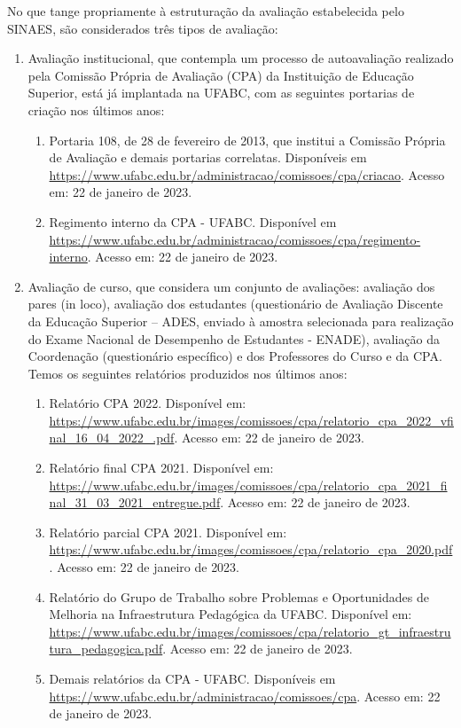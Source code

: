 No que tange propriamente à estruturação da avaliação estabelecida pelo SINAES,
são considerados três tipos de avaliação:
\begin{enumerate}
    \item Avaliação institucional, que contempla um processo de autoavaliação
    realizado pela Comissão Própria de Avaliação (CPA) da Instituição de
    Educação Superior, está já implantada na UFABC, com as seguintes portarias
    de criação nos últimos anos:
    \begin{enumerate}
        \item Portaria 108, de 28 de fevereiro de 2013, que institui a Comissão
        Própria de Avaliação e demais portarias correlatas. Disponíveis em
        \url{https://www.ufabc.edu.br/administracao/comissoes/cpa/criacao}.
        Acesso em: 22 de janeiro de 2023.
        \item Regimento interno da CPA - UFABC. Disponível em
        \url{https://www.ufabc.edu.br/administracao/comissoes/cpa/regimento-interno}.
        Acesso em: 22 de janeiro de 2023.
    \end{enumerate}
    
    \item Avaliação de curso, que considera um conjunto de avaliações:
    avaliação dos pares (in loco), avaliação dos estudantes (questionário de
    Avaliação Discente da Educação Superior – ADES, enviado à amostra
    selecionada para realização do Exame Nacional de Desempenho de Estudantes -
    ENADE), avaliação da Coordenação (questionário específico) e dos
    Professores do Curso e da CPA. Temos os seguintes relatórios produzidos nos
    últimos anos:
    \begin{enumerate}
        \item Relatório CPA 2022. Disponível em:
        \url{https://www.ufabc.edu.br/images/comissoes/cpa/relatorio_cpa_2022_vfinal_16_04_2022_.pdf}.
        Acesso em: 22 de janeiro de 2023.
        \item Relatório final CPA 2021. Disponível em:
        \url{https://www.ufabc.edu.br/images/comissoes/cpa/relatorio_cpa_2021_final_31_03_2021_entregue.pdf}.
        Acesso em: 22 de janeiro de 2023.
        \item Relatório parcial CPA 2021. Disponível em:
        \url{https://www.ufabc.edu.br/images/comissoes/cpa/relatorio_cpa_2020.pdf}.
        Acesso em: 22 de janeiro de 2023.
        \item Relatório do Grupo de Trabalho sobre Problemas e Oportunidades de
        Melhoria na Infraestrutura Pedagógica da UFABC. Disponível em:
        \url{https://www.ufabc.edu.br/images/comissoes/cpa/relatorio_gt_infraestrutura_pedagogica.pdf}.
        Acesso em: 22 de janeiro de 2023.
        \item Demais relatórios da CPA - UFABC. Disponíveis em
        \url{https://www.ufabc.edu.br/administracao/comissoes/cpa}.
        Acesso em: 22 de janeiro de 2023.
    \end{enumerate}
    

\end{enumerate}
